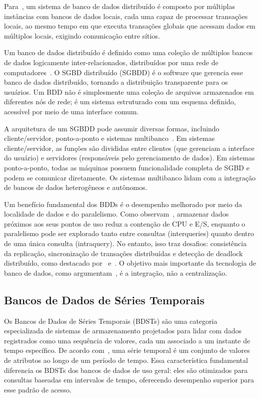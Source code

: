 Para~\cite{Silberschatz2020}, um sistema de banco de dados distribuído é composto por múltiplas
instâncias com bancos de dados locais, cada uma capaz de processar transações locais, ao mesmo
tempo em que executa transações globais que acessam dados em múltiplos locais, exigindo
comunicação entre sítios.

Um banco de dados distribuído é definido como uma coleção de múltiplos bancos de dados
logicamente inter-relacionados, distribuídos por uma rede de computadores~\citep{Ozsu2011}.
O SGBD distribuído (SGBDD) é o software que gerencia esse banco de dados distribuído, tornando
a distribuição transparente para os usuários. Um BDD não é simplesmente uma coleção de arquivos
armazenados em diferentes nós de rede; é um sistema estruturado com um esquema definido,
acessível por meio de uma interface comum.

A arquitetura de um SGBDD pode assumir diversas formas, incluindo cliente/servidor,
ponto-a-ponto e sistemas multibanco~\citep{Ozsu2011}. Em sistemas cliente/servidor, as funções
são divididas entre clientes (que gerenciam a interface do usuário) e servidores (responsáveis
pelo gerenciamento de dados). Em sistemas ponto-a-ponto, todas as máquinas possuem
funcionalidade completa de SGBD e podem se comunicar diretamente. Os sistemas multibanco lidam
com a integração de bancos de dados heterogêneos e autônomos.

Um benefício fundamental dos BDDs é o desempenho melhorado por meio da localidade de dados e
do paralelismo. Como observam~\cite{Ozsu2011}, armazenar dados próximos aos seus pontos de uso
reduz a contenção de CPU e E/S, enquanto o paralelismo pode ser explorado tanto entre consultas
(interqueries) quanto dentro de uma única consulta (intraquery). No entanto, isso traz desafios:
consistência da replicação, sincronização de transações distribuídas e detecção de deadlock
distribuído, como destacado por~\cite{Ozsu2011} e~\cite{Silberschatz2020}. O objetivo mais
importante da tecnologia de banco de dados, como argumentam~\cite{Ozsu2011}, é a integração,
não a centralização.

\subsection{Bancos de Dados de Séries Temporais}
\label{sec:tsdb-theory}

Os Bancos de Dados de Séries Temporais (BDSTs) são uma categoria especializada de sistemas
de armazenamento projetados para lidar com dados registrados como uma sequência de valores,
cada um associado a um instante de tempo específico. De acordo com~\cite{Ozsu2011}, uma série
temporal é um conjunto de valores de atributos ao longo de um período de tempo. Essa
característica fundamental diferencia os BDSTs dos bancos de dados de uso geral: eles são
otimizados para consultas baseadas em intervalos de tempo, oferecendo desempenho superior para
esse padrão de acesso.

